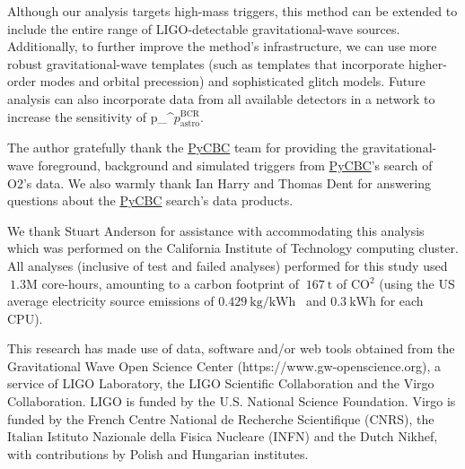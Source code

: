 \documentclass[%
 nofootinbib,
 amsmath,amssymb,
 aps,
 twocolumn,
 superscriptaddress
]{revtex4-2}
\newcommand{\pycbc}{{\sc \href{https://pycbc.org/}{{PyCBC}}}\xspace}
\newcommand{\fancytext}[1]{{\relax\ifmmode#1\else $#1$\fi}\xspace}
\newcommand{\pastrobcr}{\fancytext{p_\text{astro}^{\text{BCR}}}}
\newcommand{\avi}[1]{\textcolor{orange}{[AV: #1]}}
\newcommand{\greg}[1]{\textcolor{purple}{[Greg: #1]}}
\begin{document}
Although our analysis targets high-mass triggers, this method can be extended to include the entire range of LIGO-detectable gravitational-wave sources. Additionally, to further improve the method's infrastructure, we can use more robust gravitational-wave templates (such as templates that incorporate higher-order modes and orbital precession) and sophisticated glitch models. Future analysis can also incorporate data from all available detectors in a network to increase the sensitivity of \pastrobcr. 





\begin{acknowledgments}

The author gratefully thank the \pycbc team for providing the gravitational-wave foreground, background and simulated triggers from \pycbc's search of O2's data. We also warmly thank Ian Harry and Thomas Dent for answering questions about the \pycbc search's data products.  

We thank Stuart Anderson for assistance with accommodating this analysis which was performed on the California Institute of Technology computing cluster. All analyses (inclusive of test and failed analyses) performed for this study used $~1.3\mathrm{M}$ core-hours, amounting to a carbon footprint of $~167\ \mathrm{t}$ of CO$^2$ (using the US average electricity source emissions of $0.429\ \text{kg/kWh}$~\cite{greenhouse} and $0.3\ \text{kWh}$ for each CPU).

This research has made use of data, software and/or web tools obtained from the Gravitational Wave Open Science Center (https://www.gw-openscience.org), a service of LIGO Laboratory, the LIGO Scientific Collaboration and the Virgo Collaboration. LIGO is funded by the U.S. National Science Foundation. Virgo is funded by the French Centre National de Recherche Scientifique (CNRS), the Italian Istituto Nazionale della Fisica Nucleare (INFN) and the Dutch Nikhef, with contributions by Polish and Hungarian institutes.


\end{acknowledgments}
\end{document}
